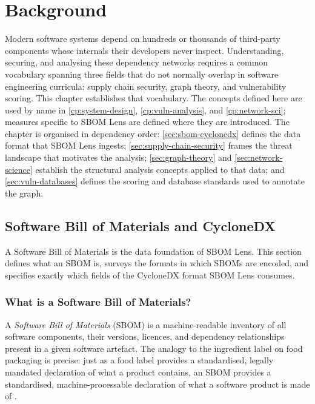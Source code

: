 \chapter[Background]{Background}
\label{cp:background}

Modern software systems depend on hundreds or thousands of third-party components whose internals their developers never inspect. Understanding, securing, and analysing these dependency networks requires a common vocabulary spanning three fields that do not normally overlap in software engineering curricula: supply chain security, graph theory, and vulnerability scoring. This chapter establishes that vocabulary. The concepts defined here are used by name in \autoref{cp:system-design}, \autoref{cp:vuln-analysis}, and \autoref{cp:network-sci}; measures specific to SBOM Lens are defined where they are introduced. The chapter is organised in dependency order: \autoref{sec:sbom-cyclonedx} defines the data format that SBOM Lens ingests; \autoref{sec:supply-chain-security} frames the threat landscape that motivates the analysis; \autoref{sec:graph-theory} and \autoref{sec:network-science} establish the structural analysis concepts applied to that data; and \autoref{sec:vuln-databases} defines the scoring and database standards used to annotate the graph.


\section{Software Bill of Materials and CycloneDX}
\label{sec:sbom-cyclonedx}

A Software Bill of Materials is the data foundation of SBOM Lens. This section defines what an SBOM is, surveys the formats in which SBOMs are encoded, and specifies exactly which fields of the CycloneDX format SBOM Lens consumes.


\subsection{What is a Software Bill of Materials?}
\label{sec:what-is-sbom}

A \textit{Software Bill of Materials} (SBOM) is a machine-readable inventory of all software components, their versions, licences, and dependency relationships present in a given software artefact. The analogy to the ingredient label on food packaging is precise: just as a food label provides a standardised, legally mandated declaration of what a product contains, an SBOM provides a standardised, machine-processable declaration of what a software product is made of \citep{NTIA2021}.

